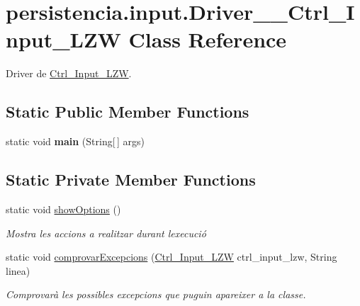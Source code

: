 \hypertarget{classpersistencia_1_1input_1_1Driver____Ctrl__Input__LZW}{}\section{persistencia.\+input.\+Driver\+\_\+\+\_\+\+Ctrl\+\_\+\+Input\+\_\+\+L\+ZW Class Reference}
\label{classpersistencia_1_1input_1_1Driver____Ctrl__Input__LZW}


Driver de \hyperlink{classpersistencia_1_1input_1_1Ctrl__Input__LZW}{Ctrl\+\_\+\+Input\+\_\+\+L\+ZW}.  


\subsection*{Static Public Member Functions}
\begin{DoxyCompactItemize}
\item 
\mbox{\label{classpersistencia_1_1input_1_1Driver____Ctrl__Input__LZW_a157252ceaf7ec257685654b5ad78049f}} 
static void {\bfseries main} (String\mbox{[}$\,$\mbox{]} args)
\end{DoxyCompactItemize}
\subsection*{Static Private Member Functions}
\begin{DoxyCompactItemize}
\item 
\mbox{\label{classpersistencia_1_1input_1_1Driver____Ctrl__Input__LZW_a6b5f6f40be349f75d3ac91ecfb453088}} 
static void \hyperlink{classpersistencia_1_1input_1_1Driver____Ctrl__Input__LZW_a6b5f6f40be349f75d3ac91ecfb453088}{show\+Options} ()
\begin{DoxyCompactList}\small\item\em Mostra les accions a realitzar durant l\textquotesingle{}execució \end{DoxyCompactList}\item 
static void \hyperlink{classpersistencia_1_1input_1_1Driver____Ctrl__Input__LZW_a86e186fca84cfae1f5a019b4853a0902}{comprovar\+Excepcions} (\hyperlink{classpersistencia_1_1input_1_1Ctrl__Input__LZW}{Ctrl\+\_\+\+Input\+\_\+\+L\+ZW} ctrl\+\_\+input\+\_\+lzw, String linea)
\begin{DoxyCompactList}\small\item\em Comprovarà les possibles excepcions que puguin apareixer a la classe. \end{DoxyCompactList}\end{DoxyCompactItemize}



